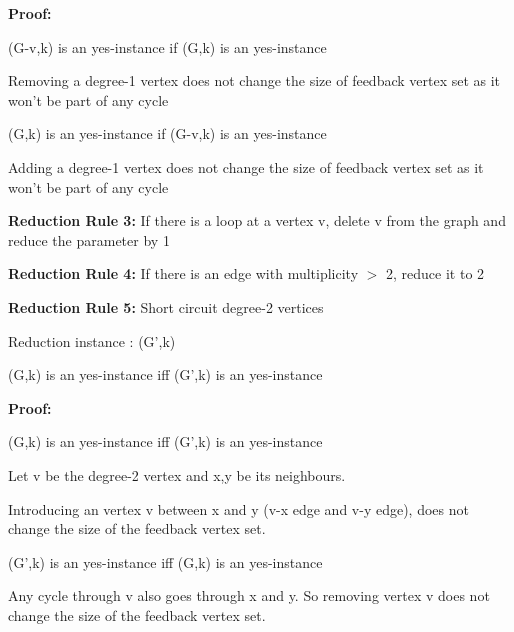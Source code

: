 \textbf{Proof:}

\hfill \vspace{-1.5cm}
      \begin{center}
                (G-v,k) is an yes-instance if (G,k) is an yes-instance 
       \end{center} \vspace{-0.2cm}
Removing a degree-1 vertex does not change the size of feedback vertex set as it won't be part 
of any cycle

\begin{center}
    (G,k) is an yes-instance if (G-v,k) is an yes-instance    
\end{center}\vspace{-0.2cm}
Adding a degree-1 vertex does not change the size of feedback vertex set as it won't be part 
of any cycle

\textbf{Reduction Rule 3:} If there is a loop at a vertex v, delete v from the graph
and reduce the parameter by 1 

\textbf{Reduction Rule 4:} If there is an edge with multiplicity $>$ 2, reduce it to 2

\textbf{Reduction Rule 5:} Short circuit degree-2 vertices 

Reduction instance : (G',k) 

\begin{theorem}
(G,k) is an yes-instance iff (G',k) is an yes-instance    
\end{theorem}

\textbf{Proof:}

\hfill \vspace{-1.5cm}
      \begin{center}
(G,k) is an yes-instance iff (G',k) is an yes-instance 
       \end{center} \vspace{-0.2cm}

Let v be the degree-2 vertex and x,y be its neighbours.

Introducing an vertex v between x and y (v-x edge and v-y edge), does not change the size
of the feedback vertex set.

\begin{center}
    (G',k) is an yes-instance iff (G,k) is an yes-instance     
\end{center}\vspace{-0.2cm}

Any cycle through v also goes through x and y. 
So removing vertex v does not change the size of the feedback vertex set. 


